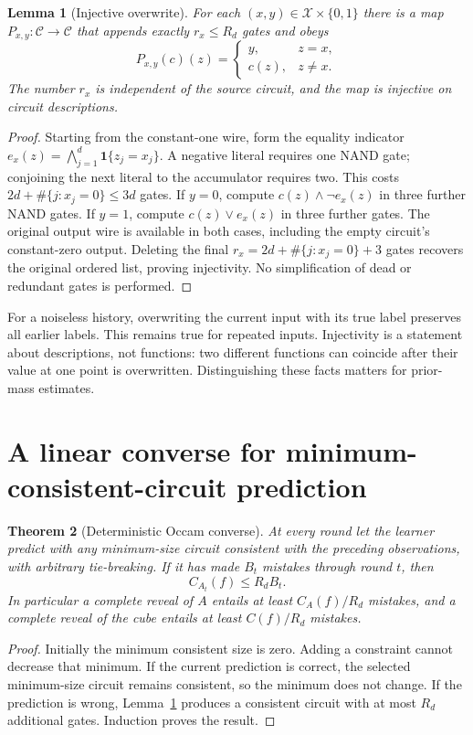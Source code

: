 \documentclass[11pt]{article}
\newtheorem{theorem}{Theorem}
\newtheorem{lemma}[theorem]{Lemma}
\newcommand{\cC}{\mathcal C}
\newcommand{\cX}{\mathcal X}
\newcommand{\1}{\mathbf 1}
\begin{document}
\begin{lemma}[Injective overwrite]\label{lem:repair}
For each $(x,y)\in\cX\times\{0,1\}$ there is a map
$P_{x,y}:\cC\to\cC$ that appends exactly $r_x\le R_d$ gates and obeys
\[
 P_{x,y}(c)(z)=
 \begin{cases}y,&z=x,\\c(z),&z\ne x.\end{cases}
\]
The number $r_x$ is independent of the source circuit, and the map is
injective on circuit descriptions.
\end{lemma}
\begin{proof}
Starting from the constant-one wire, form the equality indicator
$e_x(z)=\bigwedge_{j=1}^d\1\{z_j=x_j\}$. A negative literal requires one
NAND gate; conjoining the next literal to the accumulator requires two.
This costs $2d+\#\{j:x_j=0\}\le3d$ gates. If $y=0$, compute
$c(z)\wedge\neg e_x(z)$ in three further NAND gates. If $y=1$, compute
$c(z)\vee e_x(z)$ in three further gates. The original output wire is
available in both cases, including the empty circuit's constant-zero
output. Deleting the final $r_x=2d+\#\{j:x_j=0\}+3$ gates recovers
the original ordered list, proving injectivity. No simplification of dead
or redundant gates is performed.
\end{proof}

For a noiseless history, overwriting the current input with its true label
preserves all earlier labels. This remains true for repeated inputs.
Injectivity is a statement about descriptions, not functions: two
different functions can coincide after their value at one point is
overwritten. Distinguishing these facts matters for prior-mass estimates.

\section{A linear converse for minimum-consistent-circuit prediction}

\begin{theorem}[Deterministic Occam converse]\label{thm:occam}
At every round let the learner predict with any minimum-size circuit
consistent with the preceding observations, with arbitrary tie-breaking.
If it has made $B_t$ mistakes through round $t$, then
\[
 C_{A_t}(f)\le R_d B_t.
\]
In particular a complete reveal of $A$ entails at least
$C_A(f)/R_d$ mistakes, and a complete reveal of the cube entails at least
$C(f)/R_d$ mistakes.
\end{theorem}
\begin{proof}
Initially the minimum consistent size is zero. Adding a constraint cannot
decrease that minimum. If the current prediction is correct, the selected
minimum-size circuit remains consistent, so the minimum does not change.
If the prediction is wrong, Lemma~\ref{lem:repair} produces a consistent
circuit with at most $R_d$ additional gates. Induction proves the result.
\end{proof}
\end{document}
